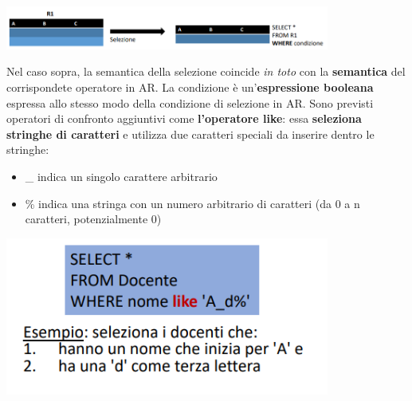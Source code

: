 \documentclass[12pt]{article}
\begin{document}
\begin{center}
    \includegraphics[width = 0.80\textwidth]{Images/171.PNG}
\end{center}
Nel caso sopra, la semantica della selezione coincide \textit{in toto} con la \textbf{semantica} del corrispondete operatore in AR.
La condizione è un'\textbf{espressione booleana} espressa allo stesso modo della condizione di selezione in AR. Sono previsti operatori di confronto aggiuntivi come \textbf{l'operatore like}:
essa \textbf{seleziona stringhe di caratteri} e utilizza due caratteri speciali da inserire dentro le stringhe:
\begin{itemize}
    \item \_ indica un singolo carattere arbitrario
    \item \% indica una stringa con un numero arbitrario di caratteri (da 0 a n caratteri, potenzialmente 0)
\end{itemize}
\begin{center}
    \includegraphics[width = 0.80\textwidth]{Images/172.PNG}
\end{center}
\end{document}
